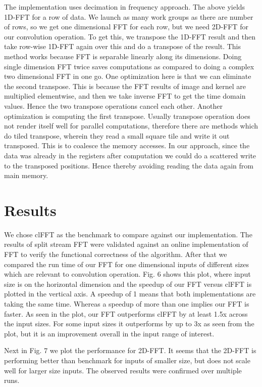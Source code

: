 \documentclass[sigconf]{acmart}
\begin{document}
The implementation uses decimation in frequency approach. The above yields 1D-FFT for a row of data. We launch as many work groups as there are number of rows, so we get one dimensional FFT for each row, but we need 2D-FFT for our convolution operation. To get this, we transpose the 1D-FFT result and then take row-wise 1D-FFT again over this and do a transpose of the result. This method works because FFT is separable linearly along its dimensions. Doing single dimension FFT twice saves computations as compared to doing a complex two dimensional FFT in one go. One optimization here is that we can eliminate the second transpose. This is because the FFT results of image and kernel are multiplied elementwise, and then we take inverse FFT to get the time domain values. Hence the two transpose operations cancel each other. Another optimization is computing the first transpose. Usually transpose operation does not render itself well for parallel computations, therefore there are methods which do tiled transpose, wherein they read a small square tile and write it out transposed. This is to coalesce the memory accesses. In our approach, since the data was already in the registers after computation we could do a scattered write to the transposed positions. Hence thereby avoiding reading the data again from main memory.

\section{Results}
We chose clFFT as the benchmark to compare against our implementation. The results of split stream FFT were validated against an online implementation of FFT to verify the functional correctness of the algorithm. After that we compared the run time of our FFT for one dimensional inputs of different sizes which are relevant to convolution operation. Fig. 6 shows this plot, where input size is on the horizontal dimension and the speedup of our FFT versus clFFT is plotted in the vertical axis. A speedup of 1 means that both implementations are taking the same time. Whereas a speedup of more than one implies our FFT is faster. As seen in the plot, our FFT outperforms clFFT by at least 1.5x across the input sizes. For some input sizes it outperforms by up to 3x as seen from the plot, but it is an improvement overall in the input range of interest.

Next in Fig. 7 we plot the performance for 2D-FFT. It seems that the 2D-FFT is performing better than benchmark for inputs of smaller size, but does not scale well for larger size inputs. The observed results were confirmed over multiple runs. 
\end{document}
